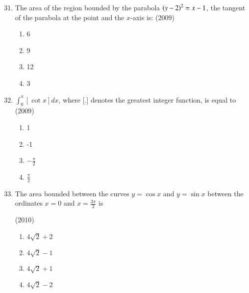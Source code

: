 \documentclass[journal,12pt,twocolumn]{IEEEtran}
\theoremstyle{remark}
\begin{document}
\begin{enumerate}[label=\textcolor{black}{\arabic*.}]
		\setcounter{enumi}{30}


	\item The area of the region bounded by the parabola $\left(y-2\right)^2=x-1$, the tangent of the parabola at the point  and the $x$-axis is:
		\hfill{(2009)}

		\begin{multicols}{4}
			\begin{enumerate}[label=(\alph*)]
				\item 6
				\item 9
				\item 12
				\item 3
			\end{enumerate}
		\end{multicols}
			
		
	\item $\int_0^\pi[\cot x]dx$, where [.] denotes the greatest integer function, is equal to
		\hfill{(2009)}

		\begin{multicols}{4}
			\begin{enumerate}[label=(\alph*)]
				\item 1
				\item -1
				\item $-\frac{\pi}{2}$
				\item $\frac{\pi}{2}$
			\end{enumerate}
		\end{multicols}


	\item The area bounded between the curves $y=\cos x$ and $y=\sin x$ between the ordinates $x=0$ and $x=\frac{3\pi}{2}$ is

		\hfill{(2010)}

		\begin{multicols}{2}
			\begin{enumerate}[label=(\alph*)]
				\item $4\sqrt{2}+2$
				\item $4\sqrt{2}-1$
				\item $4\sqrt{2}+1$
				\item $4\sqrt{2}-2$
			\end{enumerate}
		\end{multicols}



\end{enumerate}
\end{document}
